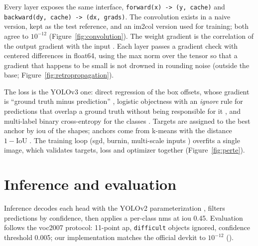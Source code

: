 \documentclass[11pt,a4paper]{article}
\begin{document}

Every layer exposes the same interface, \texttt{forward(x) -> (y, cache)} and
\texttt{backward(dy, cache) -> (dx, grads)}. The convolution exists in a naive version,
kept as the test reference, and an \gls{im2col} version used for training; both agree to
$10^{-12}$ (Figure~\ref{fig:convolution}). The weight gradient is the correlation of the
output gradient with the input \cite[\#013.0]{2202.10935}. Each layer passes a gradient
check with centered differences in float64, using the max norm over the tensor so that a
gradient that happens to be small is not drowned in rounding noise (outside the \gls{base};
Figure~\ref{fig:retropropagation}).


The loss is the YOLOv3 one: direct regression of the box offsets, whose gradient is
``ground truth minus prediction'' \cite[\#003.0]{1804.02767}, logistic \gls{objectness} with an
\emph{ignore} rule for predictions that overlap a ground truth without being responsible
for it \cite[\#003.1]{1804.02767}, and multi-label binary cross-entropy for the classes
\cite[\#004.0]{1804.02767}. Targets are assigned to the best \gls{anchor} by \gls{iou} of the shapes;
\glspl{anchor} come from k-means with the distance $1-\mathrm{IoU}$ \cite[\#002.4]{1612.08242}.
The training loop (\gls{sgd}, \gls{burnin}, multi-scale inputs \cite[\#003.3]{1612.08242}) overfits a
single image, which validates targets, loss and optimizer together
(Figure~\ref{fig:perte}).


\section{Inference and evaluation}\label{sec:inference}

Inference decodes each head with the YOLOv2 parameterization \cite[\#003.1]{1612.08242},
filters predictions by confidence, then applies a per-class \gls{nms} at \gls{iou} 0.45. Evaluation
follows the \gls{voc}2007 protocol: 11-point \gls{ap}, \texttt{difficult} objects ignored, confidence
threshold 0.005; our implementation matches the official devkit to $10^{-12}$
().
\end{document}
